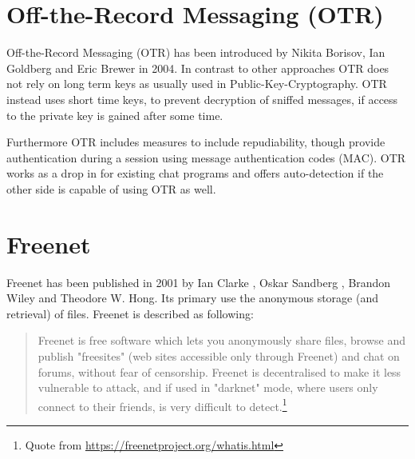 \section{Off-the-Record Messaging (OTR)}
Off-the-Record Messaging (OTR) has been introduced by
Nikita Borisov, Ian Goldberg and Eric Brewer in 2004.\cite{otr}
In contrast to other approaches OTR does not rely on long term
keys as usually used in Public-Key-Cryptography. OTR instead
uses short time keys, to prevent decryption of sniffed messages,
if access to the private key is gained after some time.

Furthermore OTR includes measures to include repudiability, though
provide authentication during a session using
message authentication codes (MAC).
OTR works as a drop in for existing chat programs and offers auto-detection
if the other side is capable of using OTR as well.
\section{Freenet}
Freenet has been published in 2001 by
Ian Clarke , Oskar Sandberg , Brandon Wiley and Theodore W. Hong.\cite{freenet}
Its primary use the anonymous storage (and retrieval) of files.
Freenet is described as following:
\begin{quote}
Freenet is free software which lets you anonymously share files, browse and publish "freesites" (web sites accessible only through Freenet) and chat on forums, without fear of censorship. Freenet is decentralised to make it less vulnerable to attack, and if used in "darknet" mode, where users only connect to their friends, is very difficult to detect.\footnote{Quote from \url{https://freenetproject.org/whatis.html}}
\end{quote}
